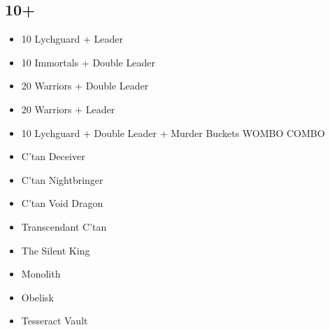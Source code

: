 \documentclass{HordeModeTarot}
\begin{document}
\begin{multicols}{2}
\subsection*{10+}

\begin{itemize}[leftmargin=*]
\item[] 10 Lychguard + Leader
\item[] 10 Immortals + Double Leader
\item[] 20 Warriors + Double Leader
\item[] 20 Warriors + Leader
\item[] 10 Lychguard + Double Leader + Murder Buckets WOMBO COMBO
\item[] C'tan Deceiver
\item[] C'tan Nightbringer
\item[] C'tan Void Dragon
\item[] Transcendant C'tan
\item[] The Silent King
\item[] Monolith
\item[] Obelisk
\item[] Tesseract Vault
\end{itemize}


\end{multicols}
\end{document}
